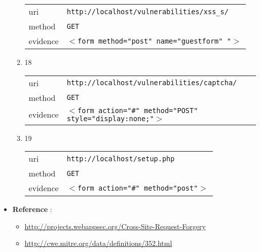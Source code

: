 \documentclass[10pt]{article}
\begin{document}
\begin{itemize}
\begin{enumerate}
\begin{tabular}{| l | p{12cm}}
uri & \texttt{http://localhost/vulnerabilities/xss\_s/} \\
method & \texttt{GET} \\
evidence & \texttt{$<$form method="post" name="guestform" "$>$} \\
\end{tabular}
\item[] 18
\begin{tabular}{| l | p{12cm}}
uri & \texttt{http://localhost/vulnerabilities/captcha/} \\
method & \texttt{GET} \\
evidence & \texttt{$<$form action="\#" method="POST" style="display:none;"$>$} \\
\end{tabular}
\item[] 19
\begin{tabular}{| l | p{12cm}}
uri & \texttt{http://localhost/setup.php} \\
method & \texttt{GET} \\
evidence & \texttt{$<$form action="\#" method="post"$>$} \\
\end{tabular}
\end{enumerate}
\item[] \textbf{Reference} : 
\begin{itemize}
\item \url{http://projects.webappsec.org/Cross-Site-Request-Forgery}
\item \url{http://cwe.mitre.org/data/definitions/352.html}
\end{itemize}
\end{itemize}
\end{document}
